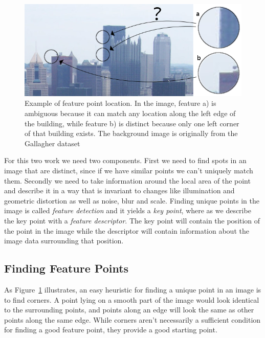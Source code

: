 \begin{figure}[t]
	\centering
	\includegraphics[width=1\columnwidth]{images/feature_point}
	\caption{Example of feature point location. In the image, feature a) 
is ambiguous because it can match any location along the left edge of 
the building, while feature b) is distinct because only one left corner 
of that building exists. The background image is originally from the 
Gallagher dataset \cite{gallagher2008}}
	\label{fig:feature_point}
\end{figure}

For this two work we need two components. First we need to find spots in 
an image that are distinct, since if we have similar points we can't 
uniquely match them. Secondly we need to take information around the 
local area of the point and describe it in a way that is invariant to 
changes like illumination and geometric distortion as well as noise, 
blur and scale. Finding unique points in the image is called 
\emph{feature detection} and it yields a \emph{key point}, where as we 
describe the key point with a \emph{feature descriptor}. The key point 
will contain the position of the point in the image while the descriptor 
will contain information about the image data surrounding that position.

\subsection{Finding Feature Points}

As Figure~\ref{fig:feature_point} illustrates, an easy heuristic for 
finding a unique point in an image is to find corners. A point lying on 
a smooth part of the image would look identical to the surrounding 
points, and points along an edge will look the same as other points 
along the same edge. While corners aren't necessarily a sufficient 
condition for finding a good feature point, they provide a good starting 
point.  

